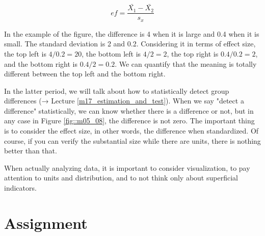 \documentclass{ltjbook}
\begin{document}
\[ ef = \frac{\bar{X_1} - \bar{X_2}}{s_x} \]

In the example of the figure, the difference is 4 when it is large and 0.4 when it is small. The standard deviation is 2 and 0.2. Considering it in terms of effect size, the top left is $4/0.2=20$, the bottom left is $4/2=2$, the top right is $0.4/0.2=2$, and the bottom right is $0.4/2=0.2$. We can quantify that the meaning is totally different between the top left and the bottom right.

In the latter period, we will talk about how to statistically detect group differences (→ Lecture \ref {m17_estimation_and_test}). When we say "detect a difference" statistically, we can know whether there is a difference or not, but in any case in Figure \ref{fig::m05_08}, the difference is not zero. The important thing is to consider the effect size, in other words, the difference when standardized. Of course, if you can verify the substantial size while there are units, there is nothing better than that.

When actually analyzing data, it is important to consider visualization, to pay attention to units and distribution, and to not think only about superficial indicators.
\section{Assignment}
\end{document}
